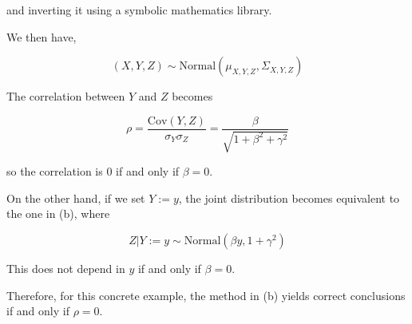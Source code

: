 and inverting it using a symbolic mathematics library.

We then have,

\[ (X, Y, Z) \sim \text{Normal}(\mu_{X, Y, Z}, \Sigma_{X, Y, Z}) \]

The correlation between \(Y\) and \(Z\) becomes

\[\rho = \frac{\text{Cov}(Y, Z)}{\sigma_Y \sigma_Z} = \frac{\beta}{\sqrt{1 + \beta^2 + \gamma^2}}\]

so the correlation is 0 if and only if \(\beta = 0\).

On the other hand, if we set \(Y := y\), the joint distribution becomes
equivalent to the one in (b), where

\[ Z | Y := y \sim \text{Normal}\left( \beta y, 1 + \gamma^2\right) \]

This does not depend in \(y\) if and only if \(\beta = 0\).

Therefore, for this concrete example, the method in (b) yields correct
conclusions if and only if \(\rho = 0\).
